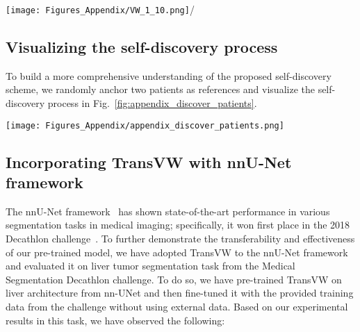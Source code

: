 \documentclass[journal,twoside,web]{ieeecolor}
\def\figurename{Fig.}
\newcommand{\eg}{\mbox{\emph{e.g.,\ }}}
\begin{document}
\begin{figure*}[t]
\centerline{\texttt{[image: Figures\_Appendix/VW\_1\_10.png]}/}
\caption{Visualization of visual words in X-ray images.  Each row presents ten instances of a distinct visual word that are extracted from ten examples randomly selected from 1,000 nearest neighbors to a random reference image, to which we assign labels 1-10.}
\label{fig:vws_1_10}
\end{figure*}

\subsection{Visualizing the self-discovery process}
\label{appendix_self_discovery}
To build a more comprehensive understanding of the proposed self-discovery scheme, we randomly anchor two patients as references and visualize the self-discovery process in \figurename~\ref{fig:appendix_discover_patients}. 



\begin{figure*}[t]

\begin{center}
 \texttt{[image: Figures\_Appendix/appendix\_discover\_patients.png]}
\end{center}
  \caption{
  Without loss of generalization, and for simplicity and clarity, we present our idea with X-ray images.  Our self-discovery process seeks to automatically discover similar visual words across patients, as illustrated in the yellow boxes within the patients framed
  in pink. Patches extracted at the same coordinate across patients may be very different
(the yellow boxes within the patients framed in blue). We overcome this issue by first
computing similarity at the patient level using the deep latent features from a feature extractor network pre-trained with an unsupervised task (\eg an autoencoder) and then mining the top nearest neighbors (framed in pink) of a random reference
patient. Extracting visual word instances from these similar patients strikes a balance
between consistency and diversity in pattern appearance for each visual word.
  }
\label{fig:appendix_discover_patients}
\end{figure*}


\subsection{Incorporating TransVW with nnU-Net framework}
\label{appendix_discussion_nnunet}
The nnU-Net framework~\cite{isensee2020automated} has shown state-of-the-art performance in various segmentation  tasks in medical imaging; specifically, it won first place in the 2018 Decathlon challenge~\cite{Amber2019large}. 
To further demonstrate the transferability and effectiveness of our pre-trained model, we have adopted TransVW to the nnU-Net framework and evaluated  it  on  liver  tumor  segmentation  task from the Medical Segmentation Decathlon challenge. To do so, we have pre-trained TransVW on liver architecture from nn-UNet and then fine-tuned it with the provided training data from the challenge without using external data.  Based on our experimental results in this task, we have observed the following:
\end{document}
